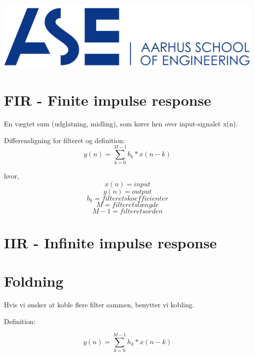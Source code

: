 \documentclass[12pt, letterpaper]{article}
\begin{document}
\begin{titlepage}

\includegraphics[scale=0.5]{billeder/au}\\ %
 

\vfill %


\end{titlepage}

\tableofcontents
\newpage

\newpage

\section{FIR - Finite impulse response}

En vægtet sum (udglatning, midling), som kører hen over input-signalet x(n). 

Differensligning for filteret og definition: 
$$ y(n)= \sum\limits_{k=0}^{M-1} b_k * x(n-k)$$

hvor, 
$$ x(n) = input $$
$$ y(n) = output $$
$$ b_k = filterets koefficienter $$ 
$$ M = filterets længde $$
$$ M-1 = filterets orden $$

\section{IIR - Infinite impulse response}

\section{Foldning}
Hvis vi ønsker at koble flere filter sammen, benytter vi kobling. 

Definition: 

$$ y(n)= \sum\limits_{k=0}^{M-1} h_k * x(n-k) $$
\end{document}
